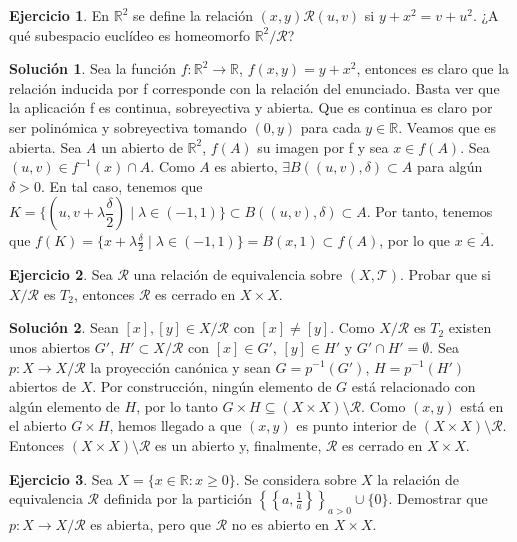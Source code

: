 \documentclass{article}
\theoremstyle{plain}
\theoremstyle{definition}
\newtheorem{exercise}{Ejercicio}
\newtheorem*{sol*}{Solución}
\newcommand{\R}{\mathbb{R}}
\begin{document}
\newpage
\begin{exercise}
En $\mathbb{R}^2$ se define la relación $(x,y) \mathcal{R} (u,v)$ si $y+x^2 = v+u^2$. ¿A qué subespacio euclídeo es homeomorfo $\mathbb{R}^2/\mathcal{R}$?
\end{exercise}
\begin{sol*}
Sea la función $f: \R^2 \to \R$, $f(x,y)=y+x^2$, entonces es claro que la relación inducida por f corresponde con la relación del enunciado. Basta ver que la aplicación f es continua, sobreyectiva y abierta. Que es continua es claro por ser polinómica y sobreyectiva tomando $(0,y)$ para cada $y\in\R$. 
\newline
Veamos que es abierta. Sea $A$ un abierto de $\R^2$, $f(A)$ su imagen por f y sea $x\in f(A)$. Sea $(u,v)\in f^{-1}(x)\cap A$. Como $A$ es abierto, $\exists B((u,v),\delta)\subset A$ para algún $\delta>0$. En tal caso, tenemos que $K=\{(u,v+\lambda \dfrac{\delta}{2}) \mid \lambda \in (-1,1)\}\subset B((u,v),\delta) \subset A$. Por tanto, tenemos que $f(K) = \{x+\lambda\frac{\delta}{2} \mid \lambda \in (-1,1)\} = B(x,1) \subset f(A)$, por lo que $x\in \mathring{A}$.
\end{sol*}

\newpage
\begin{exercise}
Sea $\mathcal{R}$ una relación de equivalencia sobre $(X, \mathcal{T})$. Probar que si $X/\mathcal{R}$ es $T_2$, entonces $\mathcal{R}$ es cerrado en $X \times X$.
\end{exercise}
\begin{sol*}
Sean $[x],[y] \in X/\mathcal{R}$ con $[x] \neq [y]$. Como $X/\mathcal{R}$ es $T_2$ existen unos abiertos $G'$, $H' \subset X/\mathcal{R}$ con $[x] \in G'$, $[y] \in H'$ y $G' \cap H' = \emptyset$. Sea $p : X \to X/\mathcal{R}$ la proyección canónica y sean $G = p^{-1}(G')$, $H = p^{-1}(H')$ abiertos de $X$. Por construcción, ningún elemento de $G$ está relacionado con algún elemento de $H$, por lo tanto $G \times H \subseteq (X \times X) \setminus \mathcal{R}$. Como $(x,y)$ está en el abierto $G \times H$, hemos llegado a que $(x,y)$ es punto interior de $(X \times X) \setminus \mathcal{R}$. Entonces $(X\times X) \setminus \mathcal{R}$ es un abierto y, finalmente, $\mathcal{R}$ es cerrado en $X \times X$.
\end{sol*}

\newpage
\begin{exercise}
Sea $X = \{x \in \mathbb{R} : x \geq 0\}$. Se considera sobre $X$ la relación de equivalencia $\mathcal{R}$ definida por la partición $\left\{\left\{a, \frac{1}{a}\right\} \right\}_{a > 0} \cup \{0\}$. Demostrar que $p : X \to X/\mathcal{R}$ es abierta, pero que $\mathcal{R}$ no es abierto en $X \times X$.
\end{exercise}
\end{document}
